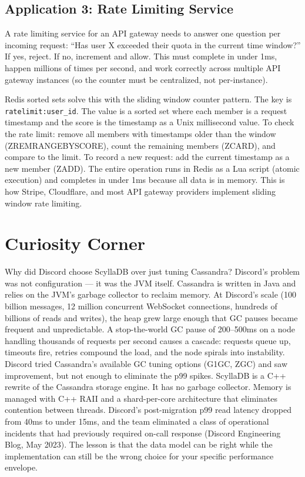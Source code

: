 \documentclass[11pt,a4paper]{article}
\begin{document}
\subsection{Application 3: Rate Limiting Service}

A rate limiting service for an API gateway needs to answer one question per incoming request: ``Has user X exceeded their quota in the current time window?'' If yes, reject. If no, increment and allow. This must complete in under 1ms, happen millions of times per second, and work correctly across multiple API gateway instances (so the counter must be centralized, not per-instance).

Redis sorted sets solve this with the sliding window counter pattern. The key is \texttt{ratelimit:user\_id}. The value is a sorted set where each member is a request timestamp and the score is the timestamp as a Unix millisecond value. To check the rate limit: remove all members with timestamps older than the window (ZREMRANGEBYSCORE), count the remaining members (ZCARD), and compare to the limit. To record a new request: add the current timestamp as a new member (ZADD). The entire operation runs in Redis as a Lua script (atomic execution) and completes in under 1ms because all data is in memory. This is how Stripe, Cloudflare, and most API gateway providers implement sliding window rate limiting.

\section{Curiosity Corner}

\begin{curiobox}{Why did Discord choose ScyllaDB over just tuning Cassandra?}
Discord's problem was not configuration --- it was the JVM itself. Cassandra is written in Java and relies on the JVM's garbage collector to reclaim memory. At Discord's scale (100 billion messages, 12 million concurrent WebSocket connections, hundreds of billions of reads and writes), the heap grew large enough that GC pauses became frequent and unpredictable. A stop-the-world GC pause of 200--500ms on a node handling thousands of requests per second causes a cascade: requests queue up, timeouts fire, retries compound the load, and the node spirals into instability. Discord tried Cassandra's available GC tuning options (G1GC, ZGC) and saw improvement, but not enough to eliminate the p99 spikes. ScyllaDB is a C++ rewrite of the Cassandra storage engine. It has no garbage collector. Memory is managed with C++ RAII and a shard-per-core architecture that eliminates contention between threads. Discord's post-migration p99 read latency dropped from 40ms to under 15ms, and the team eliminated a class of operational incidents that had previously required on-call response (Discord Engineering Blog, May 2023). The lesson is that the data model can be right while the implementation can still be the wrong choice for your specific performance envelope.
\end{curiobox}
\end{document}
